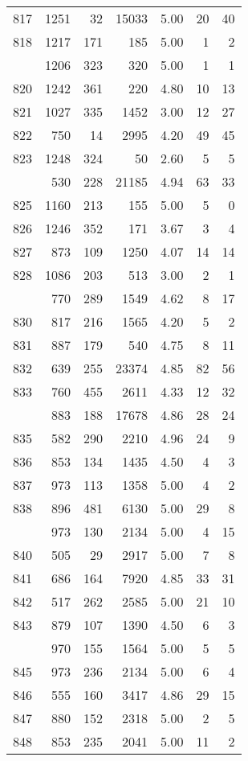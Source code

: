 \documentclass[
]{article}
\begin{document}
\begin{table}
\begin{tabular}[t]{lrrrrrr}
817 & 1251 & 32 & 15033 & 5.00 & 20 & 40\\
818 & 1217 & 171 & 185 & 5.00 & 1 & 2\\
\addlinespace
819 & 1206 & 323 & 320 & 5.00 & 1 & 1\\
820 & 1242 & 361 & 220 & 4.80 & 10 & 13\\
821 & 1027 & 335 & 1452 & 3.00 & 12 & 27\\
822 & 750 & 14 & 2995 & 4.20 & 49 & 45\\
823 & 1248 & 324 & 50 & 2.60 & 5 & 5\\
\addlinespace
824 & 530 & 228 & 21185 & 4.94 & 63 & 33\\
825 & 1160 & 213 & 155 & 5.00 & 5 & 0\\
826 & 1246 & 352 & 171 & 3.67 & 3 & 4\\
827 & 873 & 109 & 1250 & 4.07 & 14 & 14\\
828 & 1086 & 203 & 513 & 3.00 & 2 & 1\\
\addlinespace
829 & 770 & 289 & 1549 & 4.62 & 8 & 17\\
830 & 817 & 216 & 1565 & 4.20 & 5 & 2\\
831 & 887 & 179 & 540 & 4.75 & 8 & 11\\
832 & 639 & 255 & 23374 & 4.85 & 82 & 56\\
833 & 760 & 455 & 2611 & 4.33 & 12 & 32\\
\addlinespace
834 & 883 & 188 & 17678 & 4.86 & 28 & 24\\
835 & 582 & 290 & 2210 & 4.96 & 24 & 9\\
836 & 853 & 134 & 1435 & 4.50 & 4 & 3\\
837 & 973 & 113 & 1358 & 5.00 & 4 & 2\\
838 & 896 & 481 & 6130 & 5.00 & 29 & 8\\
\addlinespace
839 & 973 & 130 & 2134 & 5.00 & 4 & 15\\
840 & 505 & 29 & 2917 & 5.00 & 7 & 8\\
841 & 686 & 164 & 7920 & 4.85 & 33 & 31\\
842 & 517 & 262 & 2585 & 5.00 & 21 & 10\\
843 & 879 & 107 & 1390 & 4.50 & 6 & 3\\
\addlinespace
844 & 970 & 155 & 1564 & 5.00 & 5 & 5\\
845 & 973 & 236 & 2134 & 5.00 & 6 & 4\\
846 & 555 & 160 & 3417 & 4.86 & 29 & 15\\
847 & 880 & 152 & 2318 & 5.00 & 2 & 5\\
848 & 853 & 235 & 2041 & 5.00 & 11 & 2\\

\end{tabular}
\end{table}
\end{document}
